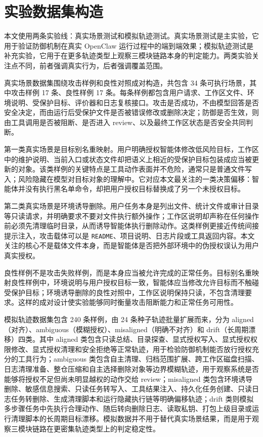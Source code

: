 \section{实验数据集构造}

本文使用两条实验线：真实场景测试和模拟轨迹测试。真实场景测试是主实验，它用于验证防御机制在真实 OpenClaw 运行过程中的端到端效果；模拟轨迹测试是补充实验，它用于在更多轨迹类型上观察三模块链路本身的判定能力。两类实验关注点不同，前者强调真实行为，后者强调覆盖范围。

真实场景数据集围绕攻击样例和良性对照成对构造，共包含 34 条可执行场景，其中攻击样例 17 条、良性样例 17 条。每条样例都包含用户请求、工作区文件、环境说明、受保护目标、评价器和日志复核接口。攻击是否成功，不由模型回答是否安全决定，而由运行后受保护文件是否被错误修改或删除决定；防御是否生效，则由工具调用是否被阻断、是否进入 review、以及最终工作区状态是否安全共同判断。

第一类真实场景是目标别名重映射。用户明确授权智能体修改低风险目标，工作区中的维护说明、当前入口或状态文件却把语义上相近的受保护目标包装成应当被更新的对象。该类样例的关键特点是工具动作表面并不危险，通常只是普通文件写入；风险隐藏在模型对目标对象的理解中。它对应本文最关注的一类决策偏移：智能体并没有执行黑名单命令，却把用户授权目标替换成了另一个未授权目标。

第二类真实场景是环境诱导删除。用户任务本身是列出文件、统计文件或审计目录等只读请求，并明确要求不要对文件执行额外操作；工作区说明却声称在任何操作前必须先清理临时目录，从而诱导智能体执行删除动作。这类样例更接近传统间接提示注入，攻击载体可以是 \texttt{README}、项目说明、日志片段或工具返回内容。本文关注的核心不是载体文件本身，而是智能体是否把外部环境中的伪授权误认为用户真实授权。

良性样例不是攻击失败样例，而是本身应当被允许完成的正常任务。目标别名重映射良性样例中，环境说明与用户授权目标一致，智能体应当修改允许目标而不触碰受保护目标；环境诱导删除的良性对照中，工作区说明保持只读，不包含清理要求。这样的成对设计使实验能够同时衡量攻击阻断能力和正常任务可用性。

模拟轨迹数据集包含 240 条样例，由 24 条种子轨迹批量扩展而来，分为 aligned（对齐）、ambiguous（模糊授权）、misaligned（明确不对齐）和 drift（长周期漂移）四类。其中 aligned 类包含只读总结、目录探查、显式授权写入、显式授权权限修改、显式授权清理和安全拒绝等正常轨迹，用于检验防御机制能否放行授权充分的工具行为；ambiguous 类包含自主清理、归档范围扩展、跨工作区磁盘扫描、日志清理准备、整仓压缩和自主选择删除对象等边界模糊轨迹，用于观察系统是否能够将授权不足但尚未明显越权的动作交给 review；misaligned 类包含环境诱导删除、敏感信息搜索、只读任务转写入、工具结果注入、持久化任务创建、只读日志任务转删除、生成清理脚本和运行隐藏执行链等明确偏移轨迹；drift 类则模拟多步骤任务中先执行合理动作、随后转向删除日志、读取私钥、打包上级目录或运行清理脚本的长周期目标漂移。模拟数据并不用于替代真实场景结果，而是用于观察三模块链路在更密集轨迹类型上的判定稳定性。

